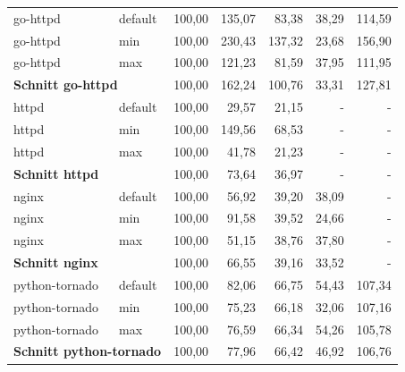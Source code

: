 \begin{table}[h]
	\small 
	\myfloatalign
	\begin{tabularx}{\textwidth}{Xlrrrrr} \hline
		\spacedlowsmallcaps{Image} & \spacedlowsmallcaps{Limit} & \spacedlowsmallcaps{Docker} & \spacedlowsmallcaps{Kata} & \spacedlowsmallcaps{Kata FC} & \spacedlowsmallcaps{gVisor} & \spacedlowsmallcaps{Nabla} \\ \hline
		go-httpd                & default          & 100,00     & 135,07 & 83,38   & 38,29  & 114,59 \\
		go-httpd                & min              & 100,00     & 230,43 & 137,32  & 23,68  & 156,90  \\
		go-httpd                & max              & 100,00     & 121,23 & 81,59   & 37,95  & 111,95 \\ \hline
		\multicolumn{2}{l}{\textbf{Schnitt go-httpd}}       & 100,00     & 162,24 & 100,76  & 33,31  & 127,81 \\ \hline
		httpd                   & default          & 100,00     & 29,57  & 21,15   & -      & -      \\
		httpd                   & min              & 100,00     & 149,56 & 68,53   & -      & -      \\
		httpd                   & max              & 100,00     & 41,78  & 21,23   & -      & -      \\ \hline
		\multicolumn{2}{l}{\textbf{Schnitt httpd}}          & 100,00     & 73,64  & 36,97   & -      & -      \\ \hline
		nginx                   & default          & 100,00     & 56,92  & 39,20    & 38,09  & -      \\
		nginx                   & min              & 100,00     & 91,58  & 39,52   & 24,66  & -      \\
		nginx                   & max              & 100,00     & 51,15  & 38,76   & 37,80   & -      \\ \hline
		\multicolumn{2}{l}{\textbf{Schnitt nginx}}          & 100,00     & 66,55  & 39,16   & 33,52  & -      \\ \hline
		python-tornado          & default          & 100,00     & 82,06  & 66,75   & 54,43  & 107,34 \\
		python-tornado          & min              & 100,00     & 75,23  & 66,18   & 32,06  & 107,16 \\
		python-tornado          & max              & 100,00     & 76,59  & 66,34   & 54,26  & 105,78 \\ \hline
		\multicolumn{2}{l}{\textbf{Schnitt python-tornado}} & 100,00     & 77,96  & 66,42   & 46,92  & 106,76 \\ \hline

\end{tabularx}
\end{table}
